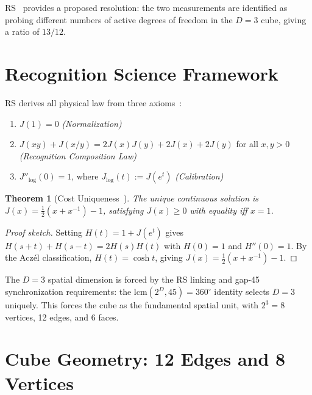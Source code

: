 \documentclass[12pt,a4paper]{article}
\newtheorem{theorem}{Theorem}[section]
\theoremstyle{definition}
\theoremstyle{remark}
\begin{document}
RS~\cite{RS_Axioms} provides a proposed resolution: the two
measurements are identified as probing different numbers of active degrees
of freedom in the $D = 3$ cube, giving a ratio of
$13/12$.

\section{Recognition Science Framework}
\label{sec:framework}

RS derives all physical law from three axioms~\cite{RS_Axioms}:
\begin{enumerate}[label=(A\arabic*),nosep]
  \item $J(1) = 0$ \hfill\textit{(Normalization)}
  \item $J(xy) + J(x/y) = 2J(x)J(y) + 2J(x) + 2J(y)$ for all $x,y>0$
  \hfill\textit{(Recognition Composition Law)}
  \item $J''_{\log}(0) = 1$, where $J_{\log}(t) := J(e^t)$
  \hfill\textit{(Calibration)}
\end{enumerate}

\begin{theorem}[Cost Uniqueness~\cite{RS_Axioms}]
\label{thm:J}
The unique continuous solution is $J(x) = \tfrac{1}{2}(x + x^{-1}) - 1$,
satisfying $J(x) \geq 0$ with equality iff $x = 1$.
\end{theorem}

\begin{proof}[Proof sketch]
Setting $H(t) = 1+J(e^t)$ gives $H(s+t)+H(s-t)=2H(s)H(t)$ with
$H(0)=1$ and $H''(0)=1$.  By the Acz\'el classification, $H(t) = \cosh t$,
giving $J(x) = \tfrac{1}{2}(x+x^{-1})-1$.
\end{proof}

The $D = 3$ spatial dimension is forced by the RS linking and gap-45 synchronization
requirements: the lcm$(2^D, 45) = 360^\circ$ identity selects $D = 3$ uniquely.
This forces the cube as the fundamental spatial unit, with $2^3 = 8$ vertices,
12 edges, and 6 faces.

\section{Cube Geometry: 12 Edges and 8 Vertices}
\label{sec:cube}
\end{document}

